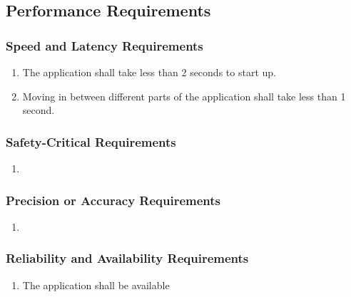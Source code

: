\documentclass[]{article}
\begin{document}

\subsection{Performance Requirements}
\label{sub:performance_requirements}

\subsubsection{Speed and Latency Requirements}
\label{ssub:speed_and_latency_requirements}
\begin{enumerate}[{PR}1. ]
	\item The application shall take less than 2 seconds to start up.
	\item Moving in between different parts of the application shall take less than
1 second.
\end{enumerate}

\subsubsection{Safety-Critical Requirements}
\label{ssub:safety_critical_requirements}
\begin{enumerate}[{PR}1. ]
	\item 
\end{enumerate}

\subsubsection{Precision or Accuracy Requirements}
\label{ssub:precision_or_accuracy_requirements}
\begin{enumerate}[{PR}1. ]
	\item 
\end{enumerate}

\subsubsection{Reliability and Availability Requirements}
\label{ssub:reliability_and_availability_requirements}
\begin{enumerate}[{PR}1. ]
	\item The application shall be available 
\end{enumerate}
\end{document}
